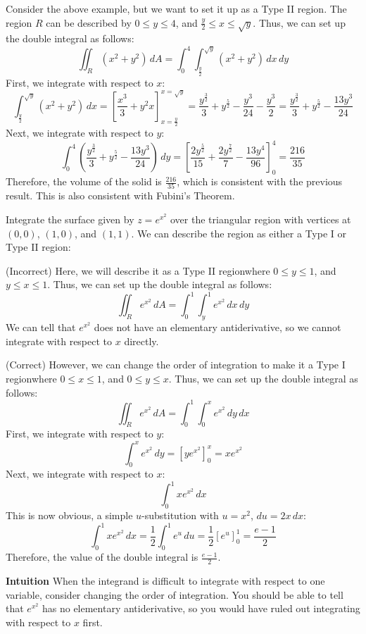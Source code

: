 \documentclass[11pt]{report}
\begin{document}
\begin{example}
    Consider the above example, but we want to set it up as a Type II region. The region $R$ can be described by $0 \le y \le 4$, and $\frac{y}{2} \le x \le \sqrt{y}$. Thus, we can set up the double integral as follows:
    $$
        \iint_R (x^2 + y^2) \, dA = \int_0^4 \int_{\frac{y}{2}}^{\sqrt{y}} (x^2 + y^2) \, dx \, dy
    $$
    First, we integrate with respect to $x$:
    $$
        \int_{\frac{y}{2}}^{\sqrt{y}} (x^2 + y^2) \, dx = \left[ \frac{x^3}{3} + y^2x \right]_{x=\frac{y}{2}}^{x=\sqrt{y}} = \frac{y^{\frac{3}{2}}}{3
        } + y^{\frac{5}{2}} - \frac{y^3}{24} - \frac{y^3}{2} = \frac{y^{\frac{3}{2}}}{3} + y^{\frac{5}{2}} - \frac{13y^3}{24}
    $$
    Next, we integrate with respect to $y$:
    $$
        \int_0^4 \left( \frac{y^{\frac{3}{2}}}{3} + y^{\frac{5}{2}} - \frac{13y^3}{24} \right) \, dy = \left[ \frac{2y^{\frac{5}{2}}}{15} + \frac{2y^{\frac{7}{2}}}{7} - \frac{13y^4}{96} \right]_0^4 = \frac{216}{35}
    $$
    Therefore, the volume of the solid is $\frac{216}{35}$, which is consistent with the previous result. This is also consistent with Fubini's Theorem.
\end{example}

\begin{example}
    Integrate the surface given by $z = e^{x^2}$ over the triangular region with vertices at $(0,0)$, $(1,0)$, and $(1,1)$. We can describe the region as either a Type I or Type II region:

    (Incorrect) Here, we will describe it as a Type II regionwhere $0 \le y \le 1$, and $y \le x \le 1$. Thus, we can set up the double integral as follows:
    $$
        \iint_R e^{x^2} \, dA = \int_0^1 \int_y^1 e^{x^2} \, dx \, dy
    $$
    We can tell that $e^{x^2}$ does not have an elementary antiderivative, so we cannot integrate with respect to $x$ directly. 
    
    (Correct) However, we can change the order of integration to make it a Type I regionwhere $0 \le x \le 1$, and $0 \le y \le x$. Thus, we can set up the double integral as follows:
    $$
        \iint_R e^{x^2} \, dA = \int_0^1 \int_0^x e^{x^2} \, dy \, dx
    $$
    First, we integrate with respect to $y$:
    $$
        \int_0^x e^{x^2} \, dy = \left[ y e^{x^2} \right]_0^x = xe^{x^2}
    $$
    Next, we integrate with respect to $x$:
    $$
        \int_0^1 xe^{x^2} \, dx
    $$
    This is now obvious, a simple $u$-substitution with $u = x^2$, $du = 2x \, dx$:
    $$
        \int_0^1 xe^{x^2} \, dx = \frac{1}{2} \int_0^1 e^u \, du = \frac{1}{2} \left[ e^u \right]_0^1 = \frac{e - 1}{2}
    $$
    Therefore, the value of the double integral is $\frac{e - 1}{2}$. 

    \textbf{Intuition} When the integrand is difficult to integrate with respect to one variable, consider changing the order of integration. You should be able to tell that $e^{x^2}$ has no elementary antiderivative, so you would have ruled out integrating with respect to $x$ first.
\end{example}
\end{document}
